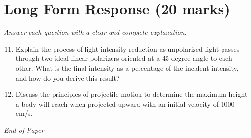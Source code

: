 \documentclass[12pt]{article}
\begin{document}
\section*{Long Form Response (20 marks)}
\textit{Answer each question with a clear and complete explanation.}
\begin{enumerate}[label=\arabic*.]
\setcounter{enumi}{10}
\item Explain the process of light intensity reduction as unpolarized light passes through two ideal linear polarizers oriented at a 45-degree angle to each other. What is the final intensity as a percentage of the incident intensity, and how do you derive this result?
\item Discuss the principles of projectile motion to determine the maximum height a body will reach when projected upward with an initial velocity of 1000 cm/s.
\end{enumerate}

\vfill
\noindent\textit{End of Paper}
\end{document}
